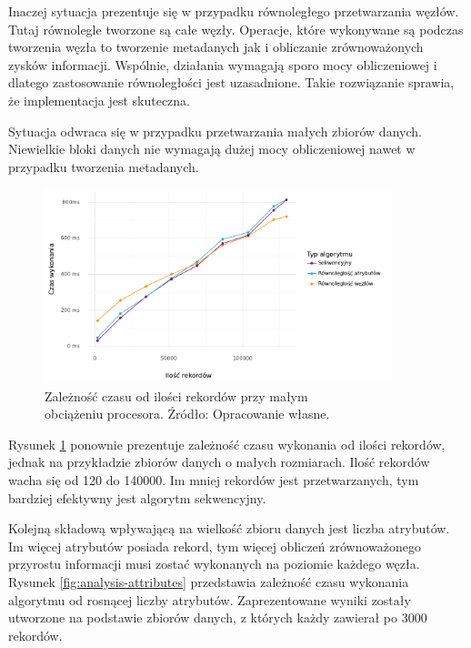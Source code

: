 \documentclass[12pt]{article}
\begin{document}
Inaczej sytuacja prezentuje się w przypadku równoległego przetwarzania węzłów. Tutaj równolegle tworzone są całe węzły. Operacje, które wykonywane są
podczas tworzenia węzła to tworzenie metadanych jak i obliczanie zrównoważonych zysków informacji. Wspólnie, działania wymagają
sporo mocy obliczeniowej i dlatego zastosowanie równoległości jest uzasadnione. Takie rozwiązanie sprawia, że implementacja jest skuteczna.

Sytuacja odwraca się w przypadku przetwarzania małych zbiorów danych. Niewielkie bloki danych nie wymagają dużej mocy obliczeniowej
nawet w przypadku tworzenia metadanych.

\begin{figure}[H]
    \centering
	\includegraphics[width=0.9\textwidth]{analysis-start.pdf}
    \caption{Zależność czasu od ilości rekordów przy małym\\obciążeniu procesora. Źródło: Opracowanie własne.}
    \label{fig:analysis-start}
\end{figure}

Rysunek \ref{fig:analysis-start} ponownie prezentuje zależność czasu wykonania od
ilości rekordów, jednak na przykładzie zbiorów danych o małych rozmiarach. Ilość rekordów wacha się od 120 do 140000. 
Im mniej rekordów jest przetwarzanych, tym bardziej efektywny jest algorytm sekwencyjny.

Kolejną składową wpływającą na wielkość zbioru danych jest liczba atrybutów. Im więcej atrybutów posiada
rekord, tym więcej obliczeń zrównoważonego przyrostu informacji musi zostać wykonanych na poziomie każdego węzła.
Rysunek \ref{fig:analysis-attributes} przedstawia zależność czasu wykonania algorytmu od rosnącej liczby atrybutów.
Zaprezentowane wyniki zostały utworzone na podstawie zbiorów danych, z których każdy zawierał po 3000 rekordów.
\end{document}
